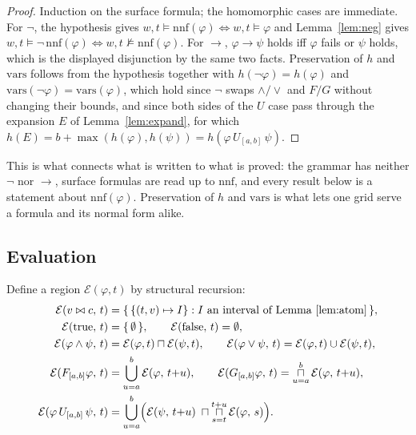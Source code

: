 \documentclass[11pt,a4paper]{article}
\theoremstyle{plain}
\theoremstyle{definition}
\theoremstyle{remark}
\newcommand{\bigsqcap}{\mathop{\sqcap}\limits}
\begin{document}
\begin{proof}
Induction on the surface formula; the homomorphic cases are immediate. For
$\lnot$, the hypothesis gives $w,t \models \mathrm{nnf}(\varphi) \iff w,t \models
\varphi$ and Lemma~\ref{lem:neg} gives $w,t \models \lnot\,\mathrm{nnf}(\varphi)
\iff w,t \not\models \mathrm{nnf}(\varphi)$. For $\to$, $\varphi \to \psi$ holds
iff $\varphi$ fails or $\psi$ holds, which is the displayed disjunction by the
same two facts. Preservation of $h$ and $\mathrm{vars}$ follows from the
hypothesis together with $h(\lnot\varphi) = h(\varphi)$ and
$\mathrm{vars}(\lnot\varphi) = \mathrm{vars}(\varphi)$, which hold since $\lnot$
swaps $\wedge/\vee$ and $F/G$ without changing their bounds, and since both sides
of the $U$ case pass through the expansion $E$ of Lemma~\ref{lem:expand}, for
which $h(E) = b + \max(h(\varphi),h(\psi)) = h(\varphi\,U_{[a,b]}\,\psi)$.
\end{proof}

This is what connects what is written to what is proved: the grammar has neither
$\lnot$ nor $\to$, surface formulas are read up to $\mathrm{nnf}$, and every
result below is a statement about $\mathrm{nnf}(\varphi)$. Preservation of $h$
and $\mathrm{vars}$ is what lets one grid serve a formula and its normal form
alike.

\subsection{Evaluation}\label{sec:eval}

Define a region $\mathcal{E}(\varphi, t)$ by structural recursion:
\begin{align*}
  \mathcal{E}(v \bowtie c,\, t) &= \{\, \{(t,v) \mapsto I\} : I \text{ an interval of Lemma~\ref{lem:atom}} \,\},\\
  \mathcal{E}(\mathrm{true},\, t) &= \{\,\emptyset\,\}, \qquad
  \mathcal{E}(\mathrm{false},\, t) = \emptyset,\\
  \mathcal{E}(\varphi \wedge \psi,\, t) &= \mathcal{E}(\varphi,t) \sqcap \mathcal{E}(\psi,t), \qquad
  \mathcal{E}(\varphi \vee \psi,\, t) = \mathcal{E}(\varphi,t) \cup \mathcal{E}(\psi,t),\\
  \mathcal{E}(F_{[a,b]}\varphi,\, t) &= \bigcup_{u=a}^{b} \mathcal{E}(\varphi,\, t{+}u), \qquad
  \mathcal{E}(G_{[a,b]}\varphi,\, t) = \bigsqcap_{u=a}^{b} \mathcal{E}(\varphi,\, t{+}u),\\
  \mathcal{E}(\varphi\,U_{[a,b]}\,\psi,\, t) &=
     \bigcup_{u=a}^{b}\Bigl( \mathcal{E}(\psi,\, t{+}u) \;\sqcap
       \bigsqcap_{s=t}^{t+u} \mathcal{E}(\varphi,\, s) \Bigr).
\end{align*}
\end{document}
